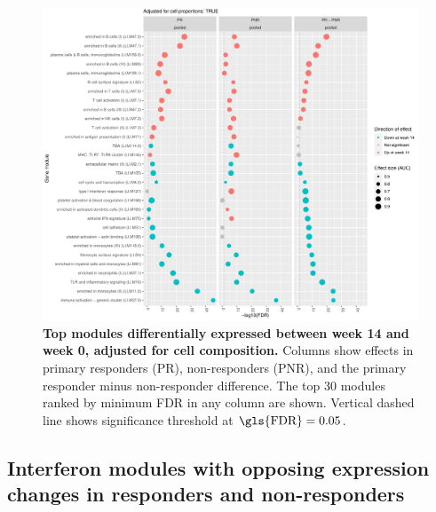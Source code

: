 \begin{figure}
    \centering
    \includegraphics[width=1.0\textwidth,page=1]{mainmatter/figures/chapter_04/plot_gene_set_enrichment.tmodCERNO_panelplot_reversed_C_3R_1R,C_3N_1N,C_(3R_1R)_(3N_1N).cell_prop_correction_TRUE.pdf}
    \caption[
    ]{
        \textbf{Top modules differentially expressed between week 14 and week 0, adjusted for cell composition.}
        Columns show effects in primary responders (PR), non-responders (PNR), and the primary responder minus non-responder difference. 
        The top 30 modules ranked by minimum \gls{FDR} in any column are shown. 
        Vertical dashed line shows significance threshold at $\text{\gls{FDR}} = 0.05$.
    }
    \label{fig:multipants_dge_panelPlot_week_14_0_R_N_cellPropT}
\end{figure}

\subsection{Interferon modules with opposing expression changes in responders and non-responders}
\label{subsec:multipants_dge_opposing_interferon}

